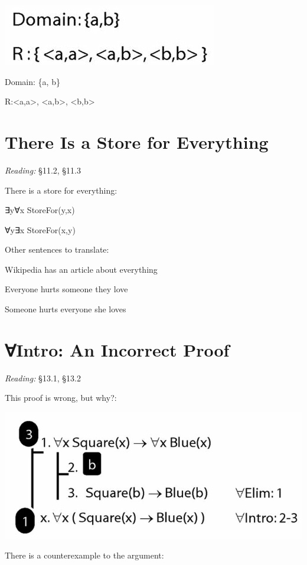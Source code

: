 \documentclass[12pt]{extarticle}
\begin{document}
\begin{multicols*}{3}
\begin{center}
\includegraphics[scale=0.3]{img/unit_583_counterexample_formal.png}
\end{center}
\hspace{3mm} Domain: \{a, b\}
 
\hspace{3mm} R:{<a,a>, <a,b>, <b,b>}
 
 
 
\section{There Is a Store for Everything}
 
\emph{Reading:} §11.2, §11.3
 
There is a store for everything:
 
\hspace{3mm}	∃y∀x StoreFor(y,x)
 
\hspace{3mm} ∀y∃x StoreFor(x,y)
 
Other sentences to translate:
 
\hspace{3mm} Wikipedia has an article about everything
 
\hspace{3mm} Everyone hurts someone they love
 
\hspace{3mm} Someone hurts everyone she loves
 
 
 
\section{∀Intro: An Incorrect Proof}
 
\emph{Reading:} §13.1, §13.2
 
This proof is wrong, but why?:
 
\begin{center}
\includegraphics[scale=0.3]{img/unit_572_proof.png}
\end{center}
There is a counterexample to the argument:
 

\end{multicols*}
\end{document}
